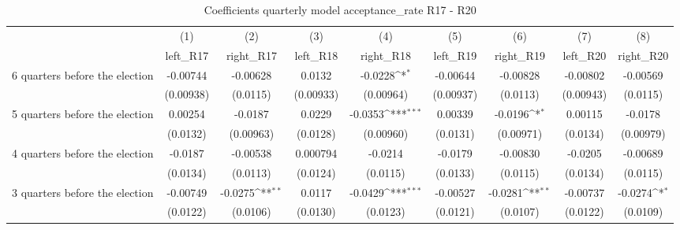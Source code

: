 \begin{table}[htbp]\centering
\def\sym#1{\ifmmode^{#1}\else\(^{#1}\)\fi}
\caption{Coefficients quarterly model acceptance\_rate R17 - R20}
\begin{tabular}{l*{8}{c}}
\hline\hline
                    &\multicolumn{1}{c}{(1)}&\multicolumn{1}{c}{(2)}&\multicolumn{1}{c}{(3)}&\multicolumn{1}{c}{(4)}&\multicolumn{1}{c}{(5)}&\multicolumn{1}{c}{(6)}&\multicolumn{1}{c}{(7)}&\multicolumn{1}{c}{(8)}\\
                    &\multicolumn{1}{c}{left\_R17}&\multicolumn{1}{c}{right\_R17}&\multicolumn{1}{c}{left\_R18}&\multicolumn{1}{c}{right\_R18}&\multicolumn{1}{c}{left\_R19}&\multicolumn{1}{c}{right\_R19}&\multicolumn{1}{c}{left\_R20}&\multicolumn{1}{c}{right\_R20}\\
\hline
 6 quarters before the election&    -0.00744         &    -0.00628         &      0.0132         &     -0.0228\sym{*}  &    -0.00644         &    -0.00828         &    -0.00802         &    -0.00569         \\
                    &   (0.00938)         &    (0.0115)         &   (0.00933)         &   (0.00964)         &   (0.00937)         &    (0.0113)         &   (0.00943)         &    (0.0115)         \\
[1em]
 5 quarters before the election&     0.00254         &     -0.0187         &      0.0229         &     -0.0353\sym{***}&     0.00339         &     -0.0196\sym{*}  &     0.00115         &     -0.0178         \\
                    &    (0.0132)         &   (0.00963)         &    (0.0128)         &   (0.00960)         &    (0.0131)         &   (0.00971)         &    (0.0134)         &   (0.00979)         \\
[1em]
 4 quarters before the election&     -0.0187         &    -0.00538         &    0.000794         &     -0.0214         &     -0.0179         &    -0.00830         &     -0.0205         &    -0.00689         \\
                    &    (0.0134)         &    (0.0113)         &    (0.0124)         &    (0.0115)         &    (0.0133)         &    (0.0115)         &    (0.0134)         &    (0.0115)         \\
[1em]
 3 quarters before the election&    -0.00749         &     -0.0275\sym{**} &      0.0117         &     -0.0429\sym{***}&    -0.00527         &     -0.0281\sym{**} &    -0.00737         &     -0.0274\sym{*}  \\
                    &    (0.0122)         &    (0.0106)         &    (0.0130)         &    (0.0123)         &    (0.0121)         &    (0.0107)         &    (0.0122)         &    (0.0109)         \\

\end{tabular}
\end{table}
